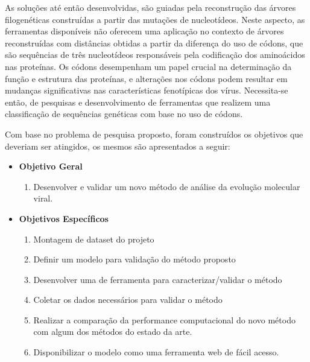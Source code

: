 
As soluções até então desenvolvidas, são guiadas pela reconstrução das árvores filogenéticas construídas a partir das mutações de nucleotídeos. Neste aspecto, as ferramentas disponíveis não oferecem uma aplicação no contexto de árvores reconstruídas com distâncias obtidas a partir da diferença do uso de códons, que são sequências de três nucleotídeos responsáveis pela codificação dos aminoácidos nas proteínas. Os códons desempenham um papel crucial na determinação da função e estrutura das proteínas, e alterações nos códons podem resultar em mudanças significativas nas características fenotípicas dos vírus. Necessita-se então, de pesquisas e desenvolvimento de ferramentas que realizem uma classificação de sequências genéticas com base no uso de códons.


Com base no problema de pesquisa proposto, foram construídos os objetivos que deveriam ser atingidos, os mesmos são apresentados a seguir:
\begin{itemize}
  \item \textbf{Objetivo Geral}
        \begin{enumerate}[label=~(\roman*)]
          \item Desenvolver e validar um novo método de análise da evolução molecular viral.
        \end{enumerate}
  \item \textbf{Objetivos Específicos}
        \begin{enumerate}[label=~(\roman*)]
          \item Montagem de dataset do projeto
          \item Definir um modelo para validação do método proposto
          \item Desenvolver uma de ferramenta para caracterizar/validar o método
          \item Coletar os dados necessários para validar o método
          \item Realizar a comparação da performance computacional do novo método com algum dos métodos do estado da arte.
          \item Disponibilizar o modelo como uma ferramenta web de fácil acesso.
        \end{enumerate}
\end{itemize}

